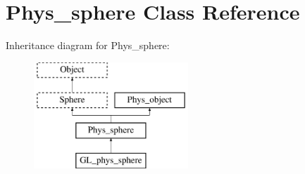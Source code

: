 \hypertarget{class_phys__sphere}{
\section{Phys\_\-sphere Class Reference}
\label{class_phys__sphere}
}
Inheritance diagram for Phys\_\-sphere:\begin{figure}[H]
\begin{center}
\leavevmode
\includegraphics[height=4.000000cm]{class_phys__sphere}
\end{center}
\end{figure}
